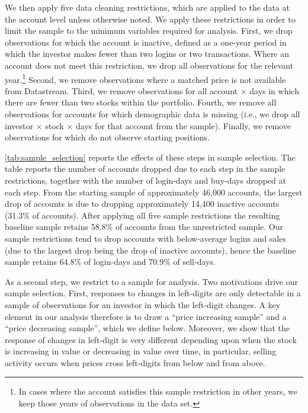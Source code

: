 We then apply five data cleaning restrictions, which are applied to the data at the account level unless otherwise noted. We apply these restrictions in order to limit the sample to the minimum variables required for analysis. First, we drop observations for which the account is inactive, defined as a one-year period in which the investor makes fewer than two logins or two transactions. Where an account does not meet this restriction, we drop all observations for the relevant year.\footnote{In cases where the account satisfies this sample restriction in other years, we keep those years of observations in the data set.} Second, we remove observations where a matched price is not available from Datastream. Third, we remove observations for all account $\times$ days in which there are fewer than two stocks within the portfolio.  Fourth, we remove all observations for accounts for which demographic data is missing (i.e., we drop all investor $\times$ stock $\times$ days for that account from the sample). Finally, we remove observations for which do not observe starting positions. 

\ref{tab:sample_selection} reports the effects of these steps in sample selection. The table reports the number of accounts dropped due to each step in the sample restrictions, together with the number of login-days and buy-days dropped at each step. From the starting sample of approximately 46,000 accounts, the largest drop of accounts is due to dropping approximately 14,400 inactive accounts (31.3\% of accounts). After applying all five sample restrictions the resulting baseline sample retains 58.8\% of accounts from the unrestricted sample. Our sample restrictions tend to drop accounts with below-average logins and sales (due to the largest drop being the drop of inactive accounts), hence the baseline sample retains 64.8\% of login-days and 70.9\% of sell-days. 

As a second step, we restrict to a sample for analysis. Two motivations drive our sample selection. First, responses to changes in left-digits are only detectable in a sample of observations for an investor in which the left-digit changes.  A key element in our analysis therefore is to draw a ``price increasing sample'' and a ``price decreasing sample'', which we define below. Moreover, we show that the response of changes in left-digit is very different depending upon when the stock is increasing in value or decreasing in value over time, in particular, selling activity occurs when prices cross left-digits from below and from above.

